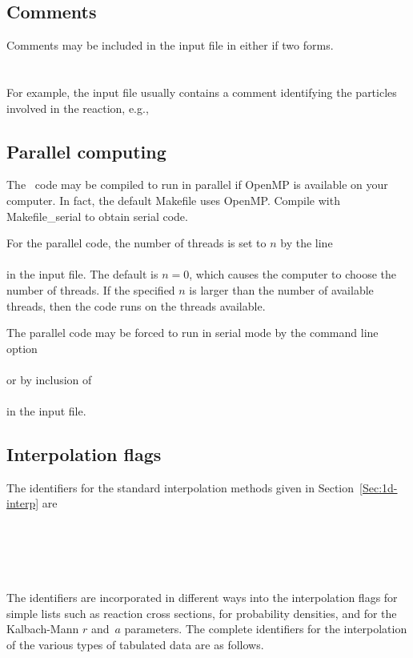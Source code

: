 \subsection{Comments}
Comments may be included in the input file in either if two forms.\\
 \\
 \\
 For example, the input file usually contains a comment identifying the
 particles involved in the reaction, e.g.,\\
 
\subsection{Parallel computing}
The \gettransfer\ code may be compiled to run in parallel if
\textsf{OpenMP} is available on your computer.  In fact, the
default \textsf{Makefile} uses \textsf{OpenMP}.  Compile with
\textsf{Makefile\_serial} to obtain serial code.  

For the parallel code, the number of threads is set to $n$ by the
line\\
  \\
in the input file.  The default is $n = 0$, which causes the computer
to choose the number of threads.  If the specified $n$ is larger than
the number of available threads, then the code runs on the threads
available.

The parallel code may be forced to run in serial mode by
the command line  option\\
  {}\\
or by inclusion of\\
 \\
in the input file.

 \subsection{Interpolation flags} \label{interp-flags}
The identifiers for the standard interpolation methods
 given in Section~\ref{Sec:1d-interp} are\\
    \\
   \\
   \\
   \\
   \\
The identifiers are incorporated in different ways into the interpolation
flags for simple lists such as reaction cross sections, for probability densities,
and for the Kalbach-Mann $r$ and~$a$ parameters.  The complete
identifiers for the interpolation of the various types of tabulated data are as follows.

